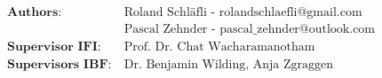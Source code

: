 \documentclass[a4paper,twoside, openright]{scrartcl}
\begin{document}
\begin{titlepage}
\vspace*{0.5\baselineskip}



\begin{align*}
\textbf{Authors:} &\ \text{Roland Schläfli - rolandschlaefli@gmail.com} \\
&\ \text{Pascal Zehnder - pascal\_zehnder@outlook.com} \\
\textbf{Supervisor IFI:} &\ \text{Prof. Dr. Chat Wacharamanotham} \\
\textbf{Supervisors IBF:} &\ \text{Dr. Benjamin Wilding, Anja Zgraggen} \\
\end{align*}

\endgroup
\end{titlepage}

\newpage


\tableofcontents

\newpage

\pagestyle{headings}









\newpage


\end{document}
